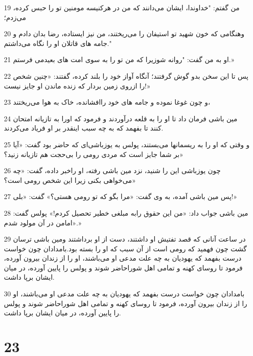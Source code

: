 \par 19 من گفتم: "خداوندا، ایشان می‌دانند که من در هرکنیسه مومنین تو را حبس کرده، می‌زدم؛
\par 20 وهنگامی که خون شهید تو استیفان را می‌ریختند، من نیز ایستاده، رضا بدان دادم و جامه های قاتلان او را نگاه می‌داشتم."
\par 21 او به من گفت: "روانه شوزیرا که من تو را به سوی امت های بعیدمی فرستم.»
\par 22 پس تا این سخن بدو گوش گرفتند؛ آنگاه آواز خود را بلند کرده، گفتند: «چنین شخص را ازروی زمین بردار که زنده ماندن او جایز نیست!»
\par 23 و چون غوغا نموده و جامه های خود راافشانده، خاک به هوا می‌ریختند،
\par 24 مین باشی فرمان داد تا او را به قلعه درآوردند و فرمود که اورا به تازیانه امتحان کنند تا بفهمد که به چه سبب اینقدر بر او فریاد می‌کردند.
\par 25 و وقتی که او را به ریسمانها می‌بستند، پولس به یوزباشی‌ای که حاضر بود گفت: «آیا بر شما جایز است که مردی رومی را بی‌حجت هم تازیانه زنید؟»
\par 26 چون یوزباشی این را شنید، نزد مین باشی رفته، او راخبر داده، گفت: «چه می‌خواهی بکنی زیرا این شخص رومی است؟»
\par 27 پس مین باشی آمده، به وی گفت: «مرا بگو که تو رومی هستی؟» گفت: «بلی!»
\par 28 مین باشی جواب داد: «من این حقوق رابه مبلغی خطیر تحصیل کردم!» پولس گفت: «امامن در آن مولود شدم.»
\par 29 در ساعت آنانی که قصد تفتیش او داشتند، دست از او برداشتند ومین باشی ترسان گشت چون فهمید که رومی است از آن سبب که او را بسته بود.بامدادان چون خواست درست بفهمد که یهودیان به چه علت مدعی او می‌باشند، او را از زندان بیرون آورده، فرمود تا روسای کهنه و تمامی اهل شوراحاضر شوند و پولس را پایین آورده، در میان ایشان برپا داشت.
\par 30 بامدادان چون خواست درست بفهمد که یهودیان به چه علت مدعی او می‌باشند، او را از زندان بیرون آورده، فرمود تا روسای کهنه و تمامی اهل شوراحاضر شوند و پولس را پایین آورده، در میان ایشان برپا داشت.

\chapter{23}

